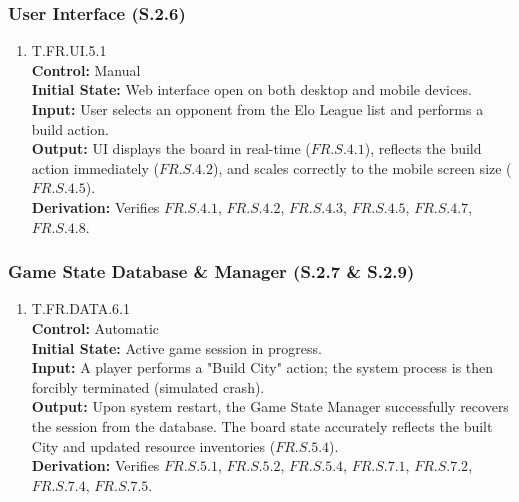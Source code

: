 \documentclass[12pt, titlepage]{article}
\begin{document}
\subsubsection{User Interface (S.2.6)}
\begin{enumerate}
    \item{\hypertarget{T.FR.UI.5.1}{T.FR.UI.5.1}\\}
    \textbf{Control:} Manual \\
    \textbf{Initial State:} Web interface open on both desktop and mobile devices. \\
    \textbf{Input:} User selects an opponent from the Elo League list and performs a build action. \\
    \textbf{Output:} UI displays the board in real-time ($\hyperref[FR.S.4.1]{FR.S.4.1}$), reflects the build action immediately ($\hyperref[FR.S.4.2]{FR.S.4.2}$), and scales correctly to the mobile screen size ($\hyperref[FR.S.4.5]{FR.S.4.5}$). \\
    \textbf{Derivation:} Verifies $\hyperref[FR.S.4.1]{FR.S.4.1}$, $\hyperref[FR.S.4.2]{FR.S.4.2}$, $\hyperref[FR.S.4.3]{FR.S.4.3}$, $\hyperref[FR.S.4.5]{FR.S.4.5}$, $\hyperref[FR.S.4.7]{FR.S.4.7}$, $\hyperref[FR.S.4.8]{FR.S.4.8}$.
\end{enumerate}

\subsubsection{Game State Database \& Manager (S.2.7 \& S.2.9)}
\begin{enumerate}
\item{\hypertarget{T.FR.DATA.6.1}{T.FR.DATA.6.1}\\}
  \textbf{Control:} Automatic \\
  \textbf{Initial State:} Active game session in progress. \\
  \textbf{Input:} A player performs a "Build City" action; the system process is then forcibly terminated (simulated crash). \\
  \textbf{Output:} Upon system restart, the Game State Manager successfully recovers the session from the database. The board state accurately reflects the built City and updated resource inventories ($\hyperref[FR.S.5.4]{FR.S.5.4}$). \\
  \textbf{Derivation:} Verifies $\hyperref[FR.S.5.1]{FR.S.5.1}$, $\hyperref[FR.S.5.2]{FR.S.5.2}$, $\hyperref[FR.S.5.4]{FR.S.5.4}$, $\hyperref[FR.S.7.1]{FR.S.7.1}$, $\hyperref[FR.S.7.2]{FR.S.7.2}$, $\hyperref[FR.S.7.4]{FR.S.7.4}$, $\hyperref[FR.S.7.5]{FR.S.7.5}$.
\end{enumerate}
\end{document}
